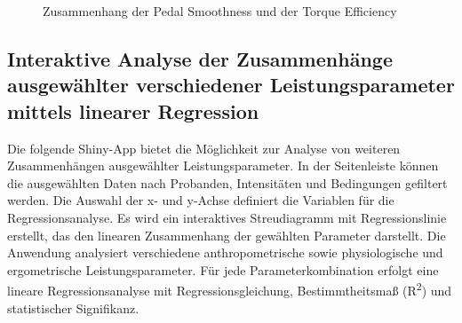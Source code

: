 \documentclass[
  letterpaper,
  DIV=11]{scrartcl}
\begin{document}
\begin{figure}


\caption{\label{fig-TE_PS}Zusammenhang der Pedal Smoothness und der
Torque Efficiency}

\end{figure}%

\subsection{Interaktive Analyse der Zusammenhänge ausgewählter
verschiedener Leistungsparameter mittels linearer
Regression}\label{interaktive-analyse-der-zusammenhuxe4nge-ausgewuxe4hlter-verschiedener-leistungsparameter-mittels-linearer-regression}

Die folgende Shiny-App bietet die Möglichkeit zur Analyse von weiteren
Zusammenhängen ausgewählter Leistungsparameter. In der Seitenleiste
können die ausgewählten Daten nach Probanden, Intensitäten und
Bedingungen gefiltert werden. Die Auswahl der x- und y-Achse definiert
die Variablen für die Regressionsanalyse. Es wird ein interaktives
Streudiagramm mit Regressionslinie erstellt, das den linearen
Zusammenhang der gewählten Parameter darstellt. Die Anwendung analysiert
verschiedene anthropometrische sowie physiologische und ergometrische
Leistungsparameter. Für jede Parameterkombination erfolgt eine lineare
Regressionsanalyse mit Regressionsgleichung, Bestimmtheitsmaß
(R\textsuperscript{2}) und statistischer Signifikanz.
\end{document}
